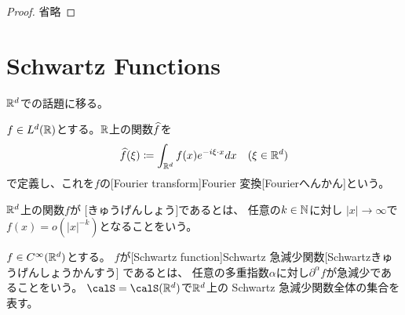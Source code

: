 \documentclass[report]{jlreq}
\begin{document}
\begin{theorem}
    \TODO{}
\end{theorem}

\begin{proof}
    省略
\end{proof}

\begin{example}[Fej\'{e}r 核]
    \TODO{}
\end{example}

\begin{example}[Dirichlet 核]
    \TODO{}
\end{example}

%
\section{Schwartz Functions}

$\mathbb{R}^d$での話題に移る。

\begin{definition}[Fourier 変換]
    $f \in L^d(\mathbb{R})$とする。$\mathbb{R}$上の関数$\widehat{f}$を
    \begin{equation}
        \widehat{f}(\xi) \coloneqq \int_{\mathbb{R}^d} f(x) e^{-i\xi \cdot x} dx \quad (\xi \in \mathbb{R}^d)
    \end{equation}
    で定義し、これを$f$の[Fourier transform]{Fourier 変換}[Fourierへんかん]という。
\end{definition}

\begin{definition}[急減少]
    $\mathbb{R}^d$上の関数$f$が
    [きゅうげんしょう]であるとは、
    任意の$k \in \mathbb{N}$に対し
    $|x| \to \infty$で$f(x) = o(|x|^{-k})$となることをいう。
\end{definition}

\begin{definition}
    $f \in C^\infty(\mathbb{R}^d)$とする。
    $f$が[Schwartz function]{Schwartz 急減少関数}[Schwartzきゅうげんしょうかんすう]
    であるとは、
    任意の多重指数$\alpha$に対し$\partial^\alpha f$が急減少であることをいう。
    $\calS = \calS(\R^d)$で$\mathbb{R}^d$上の Schwartz 急減少関数全体の集合を表す。
\end{definition}
\end{document}
